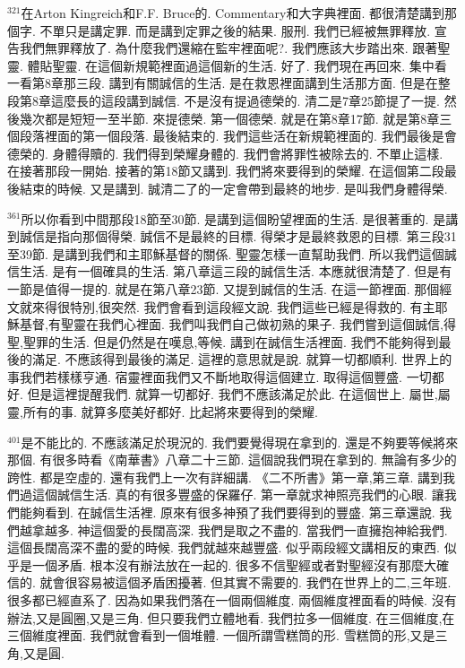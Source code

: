\documentclass{book}
\begin{document}
$^{321}$在Arton Kingreich和F.F. Bruce的.
Commentary和大字典裡面.
都很清楚講到那個字.
不單只是講定罪.
而是講到定罪之後的結果.
服刑.
我們已經被無罪釋放.
宣告我們無罪釋放了.
為什麼我們還縮在監牢裡面呢?.
我們應該大步踏出來.
跟著聖靈.
體貼聖靈.
在這個新規範裡面過這個新的生活.
好了.
我們現在再回來.
集中看一看第8章那三段.
講到有關誠信的生活.
是在救恩裡面講到生活那方面.
但是在整段第8章這麼長的這段講到誠信.
不是沒有提過德榮的.
清二是7章25節提了一提.
然後幾次都是短短一至半節.
來提德榮.
第一個德榮.
就是在第8章17節.
就是第8章三個段落裡面的第一個段落.
最後結束的.
我們這些活在新規範裡面的.
我們最後是會德榮的.
身體得贖的.
我們得到榮耀身體的.
我們會將罪性被除去的.
不單止這樣.
在接著那段一開始.
接著的第18節又講到.
我們將來要得到的榮耀.
在這個第二段最後結束的時候.
又是講到.
誠清二了的一定會帶到最終的地步.
是叫我們身體得榮.

$^{361}$所以你看到中間那段18節至30節.
是講到這個盼望裡面的生活.
是很著重的.
是講到誠信是指向那個得榮.
誠信不是最終的目標.
得榮才是最終救恩的目標.
第三段31至39節.
是講到我們和主耶穌基督的關係.
聖靈怎樣一直幫助我們.
所以我們這個誠信生活.
是有一個確具的生活.
第八章這三段的誠信生活.
本應就很清楚了.
但是有一節是值得一提的.
就是在第八章23節.
又提到誠信的生活.
在這一節裡面.
那個經文就來得很特別,很突然.
我們會看到這段經文說.
我們這些已經是得救的.
有主耶穌基督,有聖靈在我們心裡面.
我們叫我們自己做初熟的果子.
我們嘗到這個誠信,得聖,聖罪的生活.
但是仍然是在嘆息,等候.
講到在誠信生活裡面.
我們不能夠得到最後的滿足.
不應該得到最後的滿足.
這裡的意思就是說.
就算一切都順利.
世界上的事我們若樣樣亨通.
宿靈裡面我們又不斷地取得這個建立.
取得這個豐盛.
一切都好.
但是這裡提醒我們.
就算一切都好.
我們不應該滿足於此.
在這個世上.
屬世,屬靈,所有的事.
就算多麼美好都好.
比起將來要得到的榮耀.

$^{401}$是不能比的.
不應該滿足於現況的.
我們要覺得現在拿到的.
還是不夠要等候將來那個.
有很多時看《南華書》八章二十三節.
這個說我們現在拿到的.
無論有多少的跨性.
都是空虛的.
還有我們上一次有詳細講.
《二不所書》第一章,第三章.
講到我們過這個誠信生活.
真的有很多豐盛的保羅仔.
第一章就求神照亮我們的心眼.
讓我們能夠看到.
在誠信生活裡.
原來有很多神預了我們要得到的豐盛.
第三章還說.
我們越拿越多.
神這個愛的長闊高深.
我們是取之不盡的.
當我們一直擁抱神給我們.
這個長闊高深不盡的愛的時候.
我們就越來越豐盛.
似乎兩段經文講相反的東西.
似乎是一個矛盾.
根本沒有辦法放在一起的.
很多不信聖經或者對聖經沒有那麼大確信的.
就會很容易被這個矛盾困擾著.
但其實不需要的.
我們在世界上的二,三年班.
很多都已經直系了.
因為如果我們落在一個兩個維度.
兩個維度裡面看的時候.
沒有辦法,又是圓圈,又是三角.
但只要我們立體地看.
我們拉多一個維度.
在三個維度,在三個維度裡面.
我們就會看到一個堆體.
一個所謂雪糕筒的形.
雪糕筒的形,又是三角,又是圓.
\end{document}
